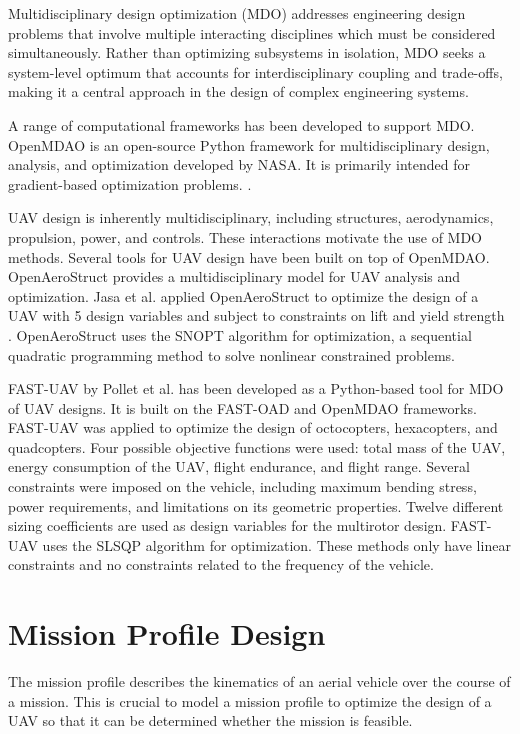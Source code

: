 \documentclass[doublespace,nopageskip]{VTthesis}
\begin{document}
			Multidisciplinary design optimization (MDO) addresses engineering design problems that involve multiple interacting disciplines which must be considered simultaneously. Rather than optimizing subsystems in isolation, MDO seeks a system-level optimum that accounts for interdisciplinary coupling and trade-offs, making it a central approach in the design of complex engineering systems.
			
			A range of computational frameworks has been developed to support MDO. OpenMDAO is an open-source Python framework for multidisciplinary design, analysis, and optimization developed by NASA. It is primarily intended for gradient-based optimization problems. \cite{Gray2019a}. 
			
			UAV design is inherently multidisciplinary, including structures, aerodynamics, propulsion, power, and controls. These interactions motivate the use of MDO methods. Several tools for UAV design have been built on top of OpenMDAO. OpenAeroStruct provides a multidisciplinary model for UAV analysis and optimization. Jasa et al. applied OpenAeroStruct to optimize the design of a UAV with 5 design variables and subject to constraints on lift and yield strength \cite{Jasa_Hwang_Martins_2018}. OpenAeroStruct uses the SNOPT algorithm for optimization, a sequential quadratic programming method to solve nonlinear constrained problems. 
			
			FAST-UAV by Pollet et al.\cite{pollet_design_2024} has been developed as a Python-based tool for MDO of UAV designs. It is built on the FAST-OAD and OpenMDAO frameworks. FAST-UAV was applied to optimize the design of octocopters, hexacopters, and quadcopters. Four possible objective functions were used: total mass of the UAV, energy consumption of the UAV, flight endurance, and flight range. Several constraints were imposed on the vehicle, including maximum bending stress, power requirements, and limitations on its geometric properties. Twelve different sizing coefficients are used as design variables for the multirotor design. FAST-UAV uses the SLSQP algorithm for optimization. These methods only have linear constraints and no constraints related to the frequency of the vehicle. 
			
			
		\section{Mission Profile Design}
			
			The mission profile describes the kinematics of an aerial vehicle over the course of a mission. This is crucial to model a mission profile to optimize the design of a UAV so that it can be determined whether the mission is feasible. 
			
\end{document}
